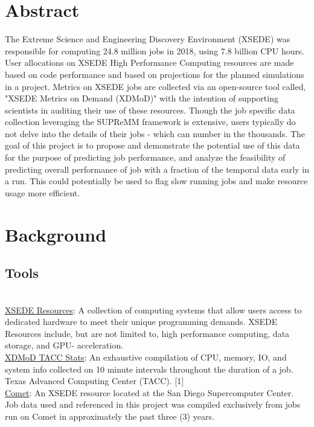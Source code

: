 \documentclass[10pt]{article}
\newenvironment{boxit}{
   \begin{lrbox}{\dummybox}
      \begin{minipage}{0.925\columnwidth}
      }{
      \end{minipage}
   \end{lrbox}
   \raisebox{-\depth}
      {\psshadowbox[framesep=1em,framearc=0.1,shadow=true]
         {\usebox{\dummybox}}}
   \vspace{0.005\textheight}
}
\begin{document}
\begin{center}
\begin{multicols}{3}

         \begin{boxit}
            \section*{\red Abstract}
            \vspace{-0.75em}
               The Extreme Science and Engineering Discovery Environment (XSEDE) was responsible for computing 24.8 million jobs in 2018, using 7.8 billion CPU hours. User allocations on XSEDE High Performance Computing resources are made based on code performance and based on projections for the planned simulations in a project. Metrics on XSEDE jobs are collected via an open-source tool called, "XSEDE Metrics on Demand (XDMoD)" with the intention of supporting scientists in auditing their use of these resources. Though the job specific data collection leveraging the SUPReMM framework is extensive, users typically do not delve into the details of their jobs - which can number in the thousands. The goal of this project is to propose and demonstrate the potential use of this data for the purpose of predicting job performance, and analyze the feasibility of predicting overall performance of job with a fraction of the temporal data early in a run. This could potentially be used to flag slow running jobs and make resource usage more efficient.


            \section*{\red Background}
            \vspace{-0.75em}
            \subsection*{\red Tools}
               \\\underline{XSEDE Resources}: A collection of computing systems that allow users access to dedicated hardware to meet their unique programming demands. XSEDE Resources include, but are not limited to, high performance computing, data storage, and GPU- acceleration.
               \\\underline{XDMoD TACC Stats}: An exhaustive compilation of CPU, memory, IO, and system info collected on 10 minute intervals throughout the duration of a job. Texas Advanced Computing Center (TACC). [1]
               \\\underline{Comet}: An XSEDE resource located at the San Diego Supercomputer Center. Job data used and referenced in this project was compiled exclusively from jobs run on Comet in approximately the past three (3) years.
               

\end{boxit}
\end{multicols}
\end{center}
\end{document}
